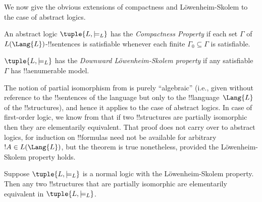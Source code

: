 \documentclass[../../include/open-logic-section]{subfiles}
\begin{document}


We now give the obvious extensions of compactness and
L\"owenheim-Skolem to the case of abstract logics. 

\begin{defn}
An abstract logic $\tuple{L, \models_L}$ has the \emph{Compactness
  Property} if each set $\Gamma$ of $L(\Lang{L})$-!!{sentence}s is
satisfiable whenever each finite $\Gamma_0 \subseteq \Gamma$ is
satisfiable.
\end{defn}

\begin{defn}
$\tuple{L, \models_L}$ has the \emph{Downward L\"owenheim-Skolem
  property} if any satisfiable $\Gamma$ has !!a{enumerable} model.
\end{defn}


The notion of partial isomorphism from
 is purely ``algebraic'' (i.e.,
given without reference to the !!{sentence}s of the language but only
to the !!{language}~$\Lang{L}$ of the !!{structure}s), and hence it
applies to the case of abstract logics. In case of first-order logic,
we know from  that if two !!{structure}s are
partially isomorphic then they are elementarily equivalent. That proof
does not carry over to abstract logics, for induction on !!{formula}s
need not be available for arbitrary $!A \in L(\Lang{L})$, but the
theorem is true nonetheless, provided the L\"owenheim-Skolem property
holds.

\begin{thm}
Suppose $\tuple{L, \models_L}$ is a normal logic with the
L\"owenheim-Skolem property. Then any two !!{structure}s that are
partially isomorphic are elementarily equivalent in $\tuple{L,
  \models_L}$.
\end{thm}
\end{document}
